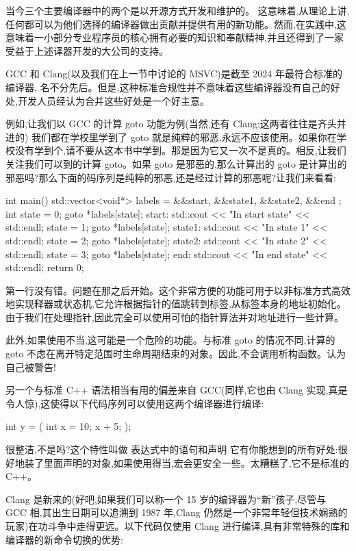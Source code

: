 
当今三个主要编译器中的两个是以开源方式开发和维护的。 这意味着,从理论上讲,任何都可以为他们选择的编译器做出贡献并提供有用的新功能。然而,在实践中,这意味着一小部分专业程序员的核心拥有必要的知识和奉献精神,并且还得到了一家受益于上述译器开发的大公司的支持。

GCC 和 Clang(以及我们在上一节中讨论的 MSVC)是截至 2024 年最符合标准的编译器, 名不分先后。但是,这种标准合规性并不意味着这些编译器没有自己的好处,开发人员经认为合并这些好处是一个好主意。

例如,让我们以 GCC 的计算 goto 功能为例(当然,还有 Clang;这两者往往是齐头并进的) 我们都在学校里学到了 goto 就是纯粹的邪恶,永远不应该使用。如果你在学校没有学到个,请不要从这本书中学到。那是因为它又一次不是真的。相反,让我们关注我们可以到的计算 goto。如果 goto 是邪恶的,那么计算出的 goto 是计算出的邪恶吗?那么下面的码序列是纯粹的邪恶,还是经过计算的邪恶呢?让我们来看看:

\begin{cpp}
int main() {
  std::vector<void*> labels = { &&start, &&state1, &&state2, &&end };
  int state = 0;
  goto *labels[state];
  start:
    std::cout << "In start state" << std::endl;
    state = 1;
    goto *labels[state];
  state1:
    std::cout << "In state 1" << std::endl;
    state = 2;
    goto *labels[state];
  state2:
    std::cout << "In state 2" << std::endl;
    state = 3;
    goto *labels[state];
  end:
    std::cout << "In end state" << std::endl;
    return 0;
}
\end{cpp}

第一行没有错。问题在那之后开始。这个非常方便的功能可用于以非标准方式高效地实现释器或状态机,它允许根据指针的值跳转到标签,从标签本身的地址初始化。由于我们在处理指针,因此完全可以使用可怕的指针算法并对地址进行一些计算。

此外,如果使用不当,这可能是一个危险的功能。与标准 goto 的情况不同,计算的 goto 不虑在离开特定范围时生命周期结束的对象。因此,不会调用析构函数。认为自己被警告! 

另一个与标准 C++ 语法相当有用的偏差来自 GCC(同样,它也由 Clang 实现,真是令人惊),这使得以下代码序列可以使用这两个编译器进行编译:

\begin{cpp}
int y = ({ int x = 10; x + 5; });
\end{cpp}

很整洁,不是吗?这个特性叫做 表达式中的语句和声明 它有你能想到的所有好处:很好地装了里面声明的对象,如果使用得当,宏会更安全一些。太糟糕了,它不是标准的 C++。

Clang 是新来的(好吧,如果我们可以称一个 15 岁的编译器为“新”孩子,尽管与 GCC 相,其出生日期可以追溯到 1987 年,Clang 仍然是一个非常年轻但技术娴熟的玩家)在功斗争中走得更远。以下代码仅使用 Clang 进行编译,具有非常特殊的库和编译器的新命令切换的优势:

